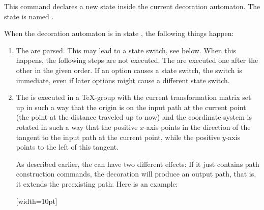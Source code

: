 \begin{command}{\pgfdeclaredecoration{}}
    \begin{command}{\state{}}
        This command declares a new state inside the current decoration
        automaton. The state is named .

        When the decoration automaton is in state , the following
        things happen:
        \begin{enumerate}
            \item The  are parsed. This may lead to a state
                switch, see below. When this happens, the following steps are
                not executed. The  are executed one after the
                other in the given order. If an option causes a state switch,
                the switch is immediate, even if later options might cause a
                different state switch.
            \item The  is executed in a \TeX-group with the current
                transformation matrix set up in such a way that the origin is
                on the input path at the current point (the point at the
                distance traveled up to now) and the coordinate system is
                rotated in such a way that the positive $x$-axis points in the
                direction of the tangent to the input path at the current
                point, while the positive $y$-axis points to the left of this
                tangent.

                As described earlier, the  can have two different
                effects: If it just contains path construction commands, the
                decoration will produce an output path, that is, it extends the
                preexisting path. Here is an example:
\begin{codeexample}[]
{
  [width=10pt]
  {
    \pgfpathlineto{\pgfpoint{0pt}{5pt}}
    \pgfpathlineto{\pgfpoint{5pt}{5pt}}
    \pgfpathlineto{\pgfpoint{5pt}{-5pt}}
    \pgfpathlineto{\pgfpoint{10pt}{-5pt}}
    \pgfpathlineto{\pgfpoint{10pt}{0pt}}
  }
  {
    \pgfpathlineto{\pgfpointdecoratedpathlast}
  }
}
\end{codeexample}


\end{enumerate}
\end{command}
\end{command}
